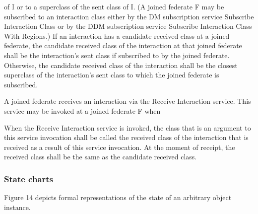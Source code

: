 \clearpage

\begin{compactstdpage}

    of I or to a superclass of the sent class of I. (A joined federate F may be subscribed to an interaction class either by the DM subscription service Subscribe Interaction Class or by the DDM subscription service Subscribe Interaction Class With Regions.) If an interaction has a candidate received class at a joined federate, the candidate received class of the interaction at that joined federate shall be the interaction's sent class if subscribed to by the joined federate. Otherwise, the candidate received class of the interaction shall be the closest superclass of the interaction's sent class to which the joined federate is subscribed.


    A joined federate receives an interaction via the Receive Interaction \rtiinitiated{} service. This service may be invoked at a joined federate F when




    When the Receive Interaction \rtiinitiated{} service is invoked, the class that is an argument to this service invocation shall be called the received class of the interaction that is received as a result of this service invocation. At the moment of receipt, the received class shall be the same as the candidate received class.

    \subsubsection{State charts}


    Figure 14 depicts formal representations of the state of an arbitrary object instance.

    \mbox{}\vfill

\end{compactstdpage}

